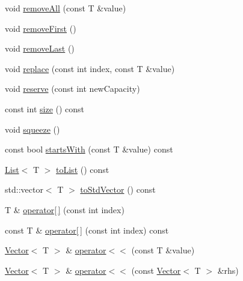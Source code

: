 \begin{DoxyCompactItemize}
\item 
void \hyperlink{classprism_1_1containers_1_1_vector_a4ada98ebf65274b4ab722574a8ec3ab4}{remove\+All} (const T \&value)
\item 
void \hyperlink{classprism_1_1containers_1_1_vector_af9ce643eaac2b99e19f777c42c2d8601}{remove\+First} ()
\item 
void \hyperlink{classprism_1_1containers_1_1_vector_a1393f714716c855540c0588eeee8957f}{remove\+Last} ()
\item 
void \hyperlink{classprism_1_1containers_1_1_vector_a540bcf579407d9af63b6e2c4ddf26a33}{replace} (const int index, const T \&value)
\item 
void \hyperlink{classprism_1_1containers_1_1_vector_ad69f77ef65090dfa70faedaabf62f8b4}{reserve} (const int new\+Capacity)
\item 
const int \hyperlink{classprism_1_1containers_1_1_vector_afca7821bc43be621b12e55f89f7f518a}{size} () const 
\item 
void \hyperlink{classprism_1_1containers_1_1_vector_a3ae1c45819282708f4200bf2a56b6384}{squeeze} ()
\item 
const bool \hyperlink{classprism_1_1containers_1_1_vector_a383a15bf1e1c828161333601ef1ad49c}{starts\+With} (const T \&value) const 
\item 
\hyperlink{classprism_1_1containers_1_1_list}{List}$<$ T $>$ \hyperlink{classprism_1_1containers_1_1_vector_ac9b3e84cd37302201b36d1cd2383e387}{to\+List} () const 
\item 
std\+::vector$<$ T $>$ \hyperlink{classprism_1_1containers_1_1_vector_a7c6c5e81b6c7afdb12ccfb782c00f2ce}{to\+Std\+Vector} () const 
\item 
T \& \hyperlink{classprism_1_1containers_1_1_vector_a54ce921915bed6b183a8d7d9e38acdb6}{operator\mbox{[}$\,$\mbox{]}} (const int index)
\item 
const T \& \hyperlink{classprism_1_1containers_1_1_vector_ad6986fcc30641bdc1f3450859e0622dc}{operator\mbox{[}$\,$\mbox{]}} (const int index) const 
\item 
\hyperlink{classprism_1_1containers_1_1_vector}{Vector}$<$ T $>$ \& \hyperlink{classprism_1_1containers_1_1_vector_abc28dad2e43233bcb6572e8f8a6b4272}{operator$<$$<$} (const T \&value)
\item 
\hyperlink{classprism_1_1containers_1_1_vector}{Vector}$<$ T $>$ \& \hyperlink{classprism_1_1containers_1_1_vector_a5b6f26e306f7dc9da7ce3baf14a283da}{operator$<$$<$} (const \hyperlink{classprism_1_1containers_1_1_vector}{Vector}$<$ T $>$ \&rhs)
\item 

\end{DoxyCompactItemize}
